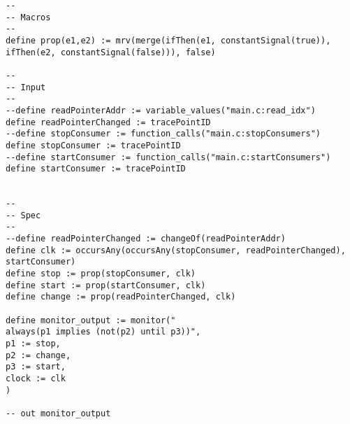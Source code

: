 \documentclass{article}
\begin{document}
\begin{lstlisting}[language=tessla+salt]
--
-- Macros
--
define prop(e1,e2) := mrv(merge(ifThen(e1, constantSignal(true)), ifThen(e2, constantSignal(false))), false)

--
-- Input
--
--define readPointerAddr := variable_values("main.c:read_idx")
define readPointerChanged := tracePointID
--define stopConsumer := function_calls("main.c:stopConsumers")
define stopConsumer := tracePointID
--define startConsumer := function_calls("main.c:startConsumers")
define startConsumer := tracePointID


--
-- Spec
--
--define readPointerChanged := changeOf(readPointerAddr)
define clk := occursAny(occursAny(stopConsumer, readPointerChanged), startConsumer)
define stop := prop(stopConsumer, clk)
define start := prop(startConsumer, clk)
define change := prop(readPointerChanged, clk)

define monitor_output := monitor("
always(p1 implies (not(p2) until p3))",
p1 := stop,
p2 := change,
p3 := start,
clock := clk
)

-- out monitor_output
\end{lstlisting}
\end{document}
